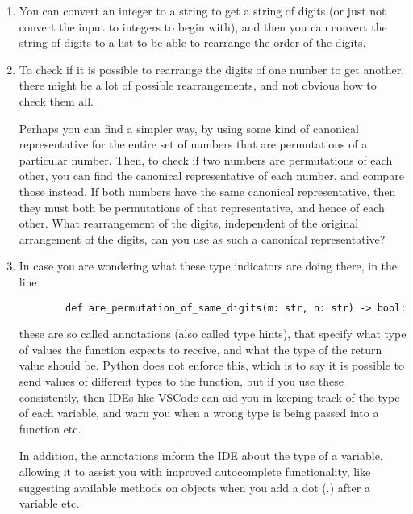 \begin{enumerate}
    \item
    You can convert an integer to a string to get a string of digits
    (or just not convert the input to integers to begin with),
    and then you can convert the string of digits to a list
    to be able to rearrange the order of the digits.

    \item
    To check if it is possible to rearrange the digits of one number to get another,
    there might be a lot of possible rearrangements,
    and not obvious how to check them all.

    Perhaps you can find a simpler way,
    by using some kind of canonical representative
    for the entire set of numbers that are permutations of a particular number.
    Then, to check if two numbers are permutations of each other,
    you can find the canonical representative of each number,
    and compare those instead.
    If both numbers have the same canonical representative,
    then they must both be permutations of that representative,
    and hence of each other.
    What rearrangement of the digits,
    independent of the original arrangement of the digits,
    can you use as such a canonical representative?

    \item
    In case you are wondering what these type indicators are doing there, in the line

    \begin{verbatim}
        def are_permutation_of_same_digits(m: str, n: str) -> bool:
    \end{verbatim}

    these are so called annotations (also called type hints),
    that specify what type of values the function expects to receive,
    and what the type of the return value should be.
    Python does not enforce this,
    which is to say it is possible to send values of different types to the function,
    but if you use these consistently,
    then IDEs like VSCode can aid you in keeping track of the type of each variable,
    and warn you when a wrong type is being passed into a function etc.

    In addition, the annotations inform the IDE about the type of a variable,
    allowing it to assist you with improved autocomplete functionality,
    like suggesting available methods on objects when you add a dot (.) after a variable etc.
\end{enumerate}


